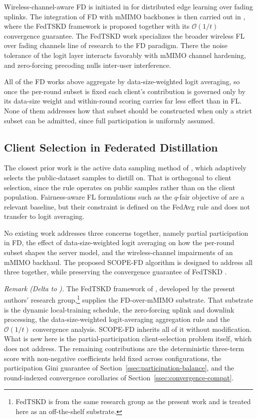 \documentclass[journal]{IEEEtran}
\newcommand{\rev}[1]{#1}
\begin{document}
Wireless-channel-aware FD is initiated in \cite{ahn2019wireless} for distributed edge learning over fading uplinks. The integration of FD with mMIMO backbones is then carried out in \cite{mu2024fedtskd}, where the FedTSKD framework is proposed together with its $\mathcal{O}(1/t)$ convergence guarantee. The FedTSKD work specializes the broader wireless FL over fading channels line of research \cite{amiri2020federated, vu2020cell} to the FD paradigm. There the noise tolerance of the logit layer interacts favorably with mMIMO channel hardening, and zero-forcing precoding nulls inter-user interference.

All of the FD works above aggregate by data-size-weighted logit averaging, so once the per-round subset is fixed each client's contribution is governed only by its data-size weight and within-round scoring carries far less effect than in FL. None of them addresses how that subset should be constructed when only a strict subset can be admitted, since full participation is uniformly assumed.

\subsection{Client Selection in Federated Distillation}
\label{ssec:rw-fd-selection}

The closest prior work is the active data sampling method of \cite{liu2022active}, which adaptively selects the public-dataset samples to distill on. That is orthogonal to client selection, since the rule operates on public samples rather than on the client population. Fairness-aware FL formulations such as the $q$-fair objective of \cite{li2020qffl} are a relevant baseline, but their constraint is defined on the FedAvg rule and does not transfer to logit averaging.

No existing work addresses three concerns together, namely partial participation in FD, the effect of data-size-weighted logit averaging on how the per-round subset shapes the server model, and the wireless-channel impairments of an mMIMO backhaul. The proposed SCOPE-FD algorithm is designed to address all three together, while preserving the convergence guarantee of FedTSKD \cite{mu2024fedtskd}.

\textit{Remark (Delta to \cite{mu2024fedtskd}).} The FedTSKD framework of \cite{mu2024fedtskd}, developed by the present authors' research group,\footnote{FedTSKD \cite{mu2024fedtskd} is from the same research group as the present work and is treated here as an off-the-shelf substrate.} supplies the FD-over-mMIMO substrate. That substrate is the dynamic local-training schedule, the zero-forcing uplink and downlink processing, the data-size-weighted logit-averaging aggregation rule and the $\mathcal{O}(1/t)$ convergence analysis. SCOPE-FD inherits all of it without modification. What is new here is the partial-participation client-selection problem itself, which \cite{mu2024fedtskd} does not address. The remaining contributions are the deterministic three-term score with non-negative coefficients held fixed across configurations, the participation Gini guarantee of Section~\ref{ssec:participation-balance}, and \rev{the round-indexed convergence corollaries of Section~\ref{ssec:convergence-compat}.}
\end{document}
